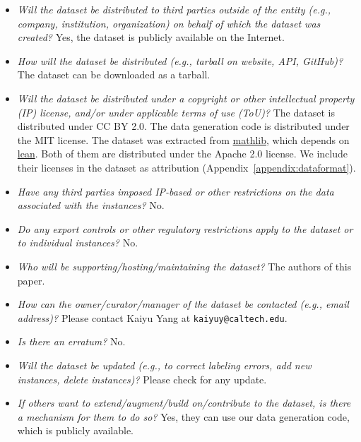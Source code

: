 \begin{itemize}[leftmargin=*]

\item \emph{Will the dataset be distributed to third parties outside of the entity (e.g., company, institution, organization) on behalf of which the dataset was created?} Yes, the dataset is publicly available on the Internet.

\item \emph{How will the dataset be distributed (e.g., tarball on website, API, GitHub)?} The dataset can be downloaded as a tarball.

\item \emph{Will the dataset be distributed under a copyright or other intellectual property (IP) license, and/or under applicable terms of use (ToU)?} The dataset is distributed under CC BY 2.0. The data generation code is distributed under the MIT license. The dataset was extracted from \href{https://github.com/leanprover-community/mathlib}{mathlib}, which depends on \href{https://github.com/leanprover-community/lean}{lean}. Both of them are distributed under the Apache 2.0 license. We include their licenses in the dataset as attribution (Appendix~\ref{appendix:dataformat}).

\item \emph{Have any third parties imposed IP-based or other restrictions on the data associated with the instances?} No.

\item \emph{Do any export controls or other regulatory restrictions apply to the dataset or to individual instances?} No.

\end{itemize}


\begin{itemize}[leftmargin=*]

\item \emph{Who will be supporting/hosting/maintaining the dataset?} The authors of this paper.

\item \emph{How can the owner/curator/manager of the dataset be contacted (e.g., email address)?} Please contact Kaiyu Yang at \texttt{kaiyuy@caltech.edu}.

\item \emph{Is there an erratum?} No.

\item \emph{Will the dataset be updated (e.g., to correct labeling errors, add new instances, delete instances)?} Please check {\weburl} for any update.

\item \emph{If others want to extend/augment/build on/contribute to the dataset, is there a mechanism for them to do so?} Yes, they can use our data generation code, which is publicly available.

\end{itemize}




